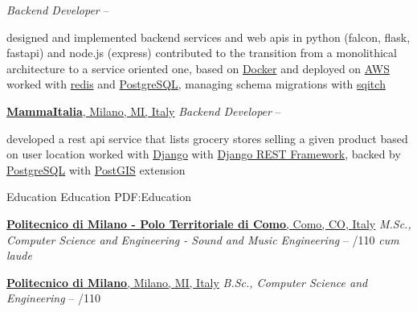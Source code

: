 \documentclass[a4paper,MMMyyyy,nonstopmode]{simpleresumecv}
\newcommand{\DoubleBigGap}{\BigGap\BigGap}
\begin{document}
\begin{Body}
        \DoubleBigGap

        \textit{Backend Developer}
          \hfill
           -- 
        \begin{Detail}
          \Gap
          \BulletItem
            designed and implemented backend services and web apis in python (falcon, flask, fastapi) and node.js (express)
          \BulletItem
            contributed to the transition from a monolithical architecture to a service oriented one, based on \href{https://www.docker.com/}{Docker} and deployed on \href{https://aws.amazon.com/}{AWS}
          \BulletItem
            worked with \href{https://redis.io/}{redis} and \href{https://www.postgresql.org/}{PostgreSQL}, managing schema migrations with \href{https://sqitch.org/}{sqitch}
        \end{Detail}

      \DoubleBigGap

      \Entry
        \href{http://mammaitaliafood.com}{\textbf{MammaItalia}, Milano, MI, Italy}
        \Gap
        \textit{Backend Developer}
          \hfill
           -- 
        \Gap
        \begin{Detail}
          \Gap
          \BulletItem
            developed a rest api service that lists grocery stores selling a given product based on user location
          \BulletItem
            worked with \href{https://www.djangoproject.com/}{Django} with \href{https://www.django-rest-framework.org/}{Django REST Framework}, backed by \href{https://www.postgresql.org/}{PostgreSQL} with \href{https://postgis.net/}{PostGIS} extension
        \end{Detail}

    \Section
    {Education}
    {Education}
    {PDF:Education}

      \Entry
        \href{http://www.polo-como.polimi.it}{\textbf{Politecnico di Milano - Polo Territoriale di Como}, Como, CO, Italy}
        \Gap
        \textit{M.Sc., Computer Science and Engineering - Sound and Music Engineering}
          \hfill
           -- 
        /110 \textit{cum laude}

      \DoubleBigGap

      \Entry
        \href{https://www.polimi.it}{\textbf{Politecnico di Milano}, Milano, MI, Italy}
        \Gap
        \textit{B.Sc., Computer Science and Engineering}
          \hfill
           -- 
        /110


\end{Body}
\end{document}
